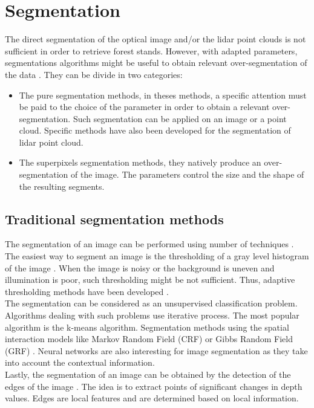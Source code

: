 \section{Segmentation}
\label{sec:C1_seg}
The direct segmentation of the optical image and/or the lidar point clouds is not sufficient in order to retrieve forest stands. However, with adapted parameters, segmentations algorithms might be useful to obtain relevant over-segmentation of the data \citep{clement_IJPRS}. They can be divide in two categories:
\begin{itemize}
\item The pure segmentation methods, in theses methods, a specific attention must be paid to the choice of the parameter in order to obtain a relevant over-segmentation. Such segmentation can be applied on an image or a point cloud. Specific methods have also been developed for the segmentation of lidar point cloud.
\item The superpixels segmentation methods, they natively produce an over-segmentation of the image. The parameters control the size and the shape of the resulting segments.
\end{itemize}

\subsection{Traditional segmentation methods}
The segmentation of an image can be performed using number of techniques \citep{pal1993review}. \\
The easiest way to segment an image is the thresholding of a gray level histogram of the image \citep{taxt1989segmentation}. When the image is noisy or the background is uneven and illumination is poor, such thresholding might be not sufficient. Thus, adaptive thresholding methods have been developed \citep{yanowitz1989new}. \\

The segmentation can be considered as an unsupervised classification problem. Algorithms dealing with such problems use iterative process. The most popular algorithm is the k-means algorithm. Segmentation methods using the spatial interaction models like Markov Random Field (CRF) \citep{hansen1982image} or Gibbs Random Field (GRF) \citep{derin1987modeling}. Neural networks are also interesting for  image segmentation \citep{ghosh1991image} as they take into account the contextual information. \\

Lastly, the segmentation of an image can be obtained by the detection of the edges of the image \citep{peli1982study}. The idea is to extract points of significant changes in depth values. Edges are local features and are determined based on local information.

